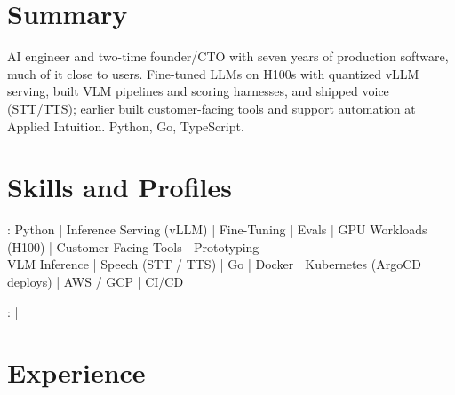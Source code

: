 \documentclass[print]{jack-resume}
\begin{document}
\pagecolor{darkmodeBackground}


\begin{minipage}[t][1cm][t]{.03\textwidth}
    \hfill
\end{minipage}

\section{Summary}
AI engineer and two-time founder/CTO with seven years of production software, much of it close to users. Fine-tuned LLMs on H100s with quantized vLLM serving, built VLM pipelines and scoring harnesses, and shipped voice (STT/TTS); earlier built customer-facing tools and support automation at Applied Intuition. Python, Go, TypeScript.
\sectionsep

\section{Skills and Profiles}
:
Python \hfill | \hfill
Inference Serving (vLLM) \hfill | \hfill
Fine-Tuning \hfill | \hfill
Evals \hfill | \hfill
GPU Workloads (H100) \hfill | \hfill
Customer-Facing Tools \hfill | \hfill
Prototyping \\
\hspace{1.0cm} VLM Inference \hfill | \hfill
Speech (STT / TTS) \hfill | \hfill
Go \hfill | \hfill
Docker \hfill | \hfill
Kubernetes (ArgoCD deploys) \hfill | \hfill
AWS / GCP \hfill | \hfill
CI/CD \\

\raggedright{
    :
      \href{https://www.linkedin.com/in/jack-sturtevant/}{ \ExternalLink} |
     \href{https://github.com/jacksturt}{ \ExternalLink}}

\section{Experience}
\end{document}
